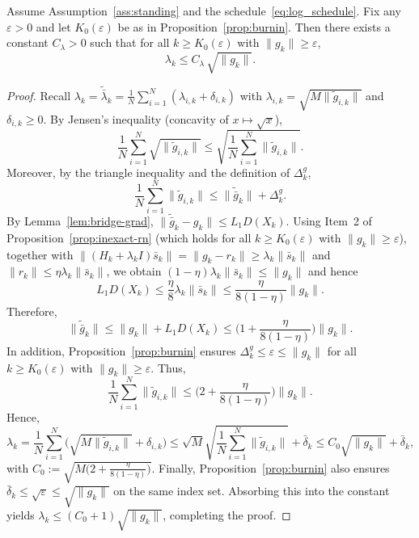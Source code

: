 \documentclass[review,onefignum,onetabnum]{siamart171218}
\begin{document}
\begin{lemma}\label{lem:lambda_scaling}
Assume Assumption~\ref{ass:standing} and the schedule~\eqref{eq:log_schedule}.
Fix any $\varepsilon>0$ and let $K_0(\varepsilon)$ be as in Proposition~\ref{prop:burnin}.
Then there exists a constant $C_\lambda>0$ such that for all $k\ge K_0(\varepsilon)$ with $\|g_k\|\ge \varepsilon$,
\[
\lambda_k\le C_\lambda\,\sqrt{\|g_k\|}.
\]
\end{lemma}
\begin{proof}
Recall $\lambda_k=\tilde{\bar\lambda}_k=\frac1N\sum_{i=1}^N(\lambda_{i,k}+\delta_{i,k})$ with
$\lambda_{i,k}=\sqrt{M\|\tilde g_{i,k}\|}$ and $\delta_{i,k}\ge 0$.
By Jensen's inequality (concavity of $x\mapsto\sqrt{x}$),
\[
\frac1N\sum_{i=1}^N \sqrt{\|\tilde g_{i,k}\|}
\le \sqrt{\frac1N\sum_{i=1}^N \|\tilde g_{i,k}\|}.
\]
Moreover, by the triangle inequality and the definition of $\Delta_k^g$,
\[
\frac1N\sum_{i=1}^N \|\tilde g_{i,k}\|
\le \|\tilde{\bar g}_k\|+\Delta_k^g.
\]
By Lemma~\ref{lem:bridge-grad}, $\|\tilde{\bar g}_k-g_k\|\le L_1D(X_k)$.
Using Item~2 of Proposition~\ref{prop:inexact-rn} (which holds for all $k\ge K_0(\varepsilon)$ with $\|g_k\|\ge \varepsilon$),
together with $\|(H_k+\lambda_k I)\bar s_k\|=\|g_k-r_k\|\ge \lambda_k\|\bar s_k\|$ and $\|r_k\|\le \eta\lambda_k\|\bar s_k\|$,
we obtain $(1-\eta)\lambda_k\|\bar s_k\|\le \|g_k\|$ and hence
\[
L_1D(X_k)\le \frac{\eta}{8}\lambda_k\|\bar s_k\|\le \frac{\eta}{8(1-\eta)}\|g_k\|.
\]
Therefore,
\[
\|\tilde{\bar g}_k\|\le \|g_k\|+L_1D(X_k)\le \Big(1+\frac{\eta}{8(1-\eta)}\Big)\|g_k\|.
\]
In addition, Proposition~\ref{prop:burnin} ensures $\Delta_k^g\le \varepsilon\le \|g_k\|$ for all $k\ge K_0(\varepsilon)$ with $\|g_k\|\ge \varepsilon$.
Thus,
\[
\frac1N\sum_{i=1}^N \|\tilde g_{i,k}\|
\le \Big(2+\frac{\eta}{8(1-\eta)}\Big)\|g_k\|.
\]
Hence,
\[
\lambda_k
= \frac1N\sum_{i=1}^N\big(\sqrt{M\|\tilde g_{i,k}\|}+\delta_{i,k}\big)
\le \sqrt{M}\sqrt{\frac1N\sum_{i=1}^N \|\tilde g_{i,k}\|}+\bar\delta_k
\le C_0\sqrt{\|g_k\|}+\bar\delta_k,
\]
with $C_0:=\sqrt{M\big(2+\frac{\eta}{8(1-\eta)}\big)}$.
Finally, Proposition~\ref{prop:burnin} also ensures $\bar\delta_k\le \sqrt{\varepsilon}\le \sqrt{\|g_k\|}$ on the same index set.
Absorbing this into the constant yields $\lambda_k\le (C_0+1)\sqrt{\|g_k\|}$, completing the proof.
\end{proof}
\end{document}
